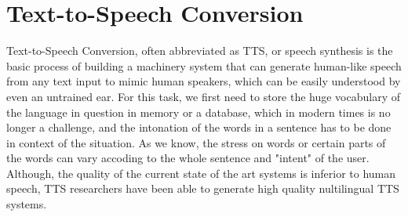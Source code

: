 \documentclass[a4paper,11pt]{kth-mag}
\begin{document}
\section{Text-to-Speech Conversion}
Text-to-Speech Conversion, often abbreviated as TTS, or speech synthesis
is the basic process of building a machinery system that can generate
human-like speech from any text input to mimic human speakers, which
can be easily understood by even an untrained ear. For this task, we 
first need to store the huge vocabulary of the language in question in memory
or a database, which in modern times is no longer a challenge, and the
intonation of the words in a sentence has to be done in context of the 
situation. As we know, the stress on words or certain parts of the words
can vary accoding to the whole sentence and "intent" of the user. Although,
the quality of the current state of the art systems is inferior to human speech,
TTS researchers have been able to generate high quality nultilingual TTS systems.   
\end{document}
